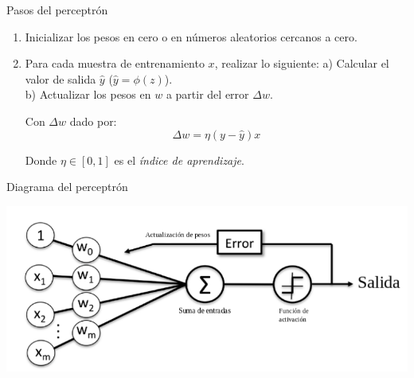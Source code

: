 \documentclass[presentation]{beamer}
\begin{document}
\begin{frame}[label={sec:org2979de4}]{Pasos del perceptrón}
\begin{enumerate}
\item Inicializar los pesos en cero o en números aleatorios cercanos a cero.
\item Para cada muestra de entrenamiento \(x\), realizar lo siguiente:
a) Calcular el valor de salida \(\hat y\) (\(\hat y = \phi(z)\)).\\
b) Actualizar los pesos en \(w\) a partir del error \(\Delta w\).

Con \(\Delta w\) dado por:
\begin{equation*}
\Delta w = \eta (y - \hat y)x
\end{equation*}

Donde \(\eta \in [0,1]\) es el \emph{índice de aprendizaje}.
\end{enumerate}
\end{frame}

\begin{frame}[label={sec:orgedf6acb}]{Diagrama del perceptrón}
\begin{center}
\includegraphics[width=.9\linewidth]{images/perceptron-summary.png}
\end{center}
\end{frame}
\end{document}
